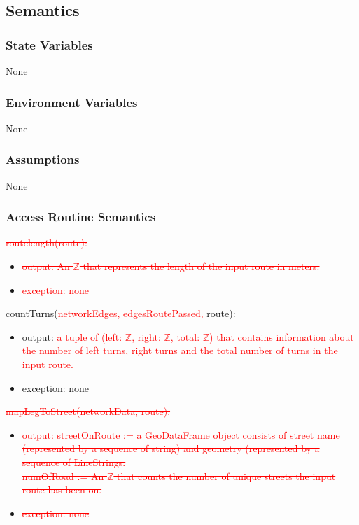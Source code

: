 \documentclass[12pt, titlepage]{article}
\begin{document}
\subsection{Semantics}

\subsubsection{State Variables}

None

\subsubsection{Environment Variables}

None

\subsubsection{Assumptions}

None

\subsubsection{Access Routine Semantics}

\noindent \textcolor{red}{\sout{routelength(route):}}
\begin{itemize}
\item \textcolor{red}{\sout{output: An $\mathbb{Z}$ that represents the length of the input route in meters.}}
\item \textcolor{red}{\sout{exception: none}}
\end{itemize}

\noindent countTurns(\textcolor{red}{networkEdges, edgesRoutePassed,} route):
\begin{itemize}
\item output: \textcolor{red}{a tuple of (left: $\mathbb{Z}$, right: $\mathbb{Z}$, total: $\mathbb{Z}$) that contains information about the number of left turns, right turns and the total number of turns in the input route.}
\item exception: none
\end{itemize}

\noindent \textcolor{red}{\sout{mapLegToStreet(networkData, route):}}
\begin{itemize}
\item \textcolor{red}{\sout{output: streetOnRoute := a GeoDataFrame object consists of street name (represented by a sequence of string) and geometry (represented by a sequence of LineStrings.\\
numOfRoad := An $\mathbb{Z}$ that counts the number of unique streets the input route has been on.}}
\item \textcolor{red}{\sout{exception: none}}
\end{itemize}
\end{document}
